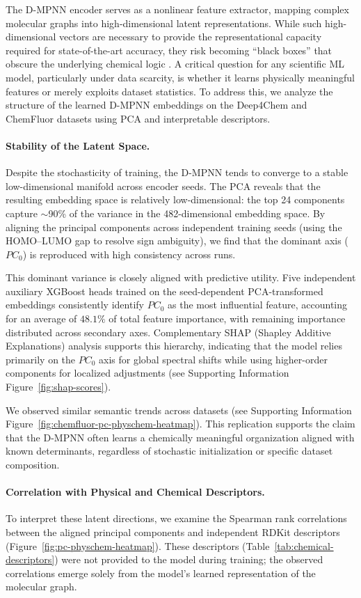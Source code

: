 The D-MPNN encoder serves as a nonlinear feature extractor, mapping complex molecular graphs into high-dimensional latent representations. While such high-dimensional vectors are necessary to provide the representational capacity required for state-of-the-art accuracy, they risk becoming ``black boxes'' that obscure the underlying chemical logic \cite{yang2019analyzing, gomez2018automatic}. A critical question for any scientific ML model, particularly under data scarcity, is whether it learns physically meaningful features or merely exploits dataset statistics. To address this, we analyze the structure of the learned D-MPNN embeddings on the Deep4Chem and ChemFluor datasets using PCA and interpretable descriptors.


\paragraph{Stability of the Latent Space.}
Despite the stochasticity of training, the D-MPNN tends to converge to a stable low-dimensional manifold across encoder seeds. The PCA reveals that the resulting embedding space is relatively low-dimensional: the top 24 components capture $\sim$90\% of the variance in the 482-dimensional embedding space. By aligning the principal components across independent training seeds (using the HOMO--LUMO gap to resolve sign ambiguity), we find that the dominant axis ($PC_0$) is reproduced with high consistency across runs.

This dominant variance is closely aligned with predictive utility. Five independent auxiliary XGBoost heads trained on the seed-dependent PCA-transformed embeddings consistently identify $PC_0$ as the most influential feature, accounting for an average of $48.1\%$ of total feature importance, with remaining importance distributed across secondary axes. Complementary SHAP (Shapley Additive Explanations) analysis supports this hierarchy, indicating that the model relies primarily on the $PC_0$ axis for global spectral shifts while using higher-order components for localized adjustments (see Supporting Information Figure~\ref{fig:shap-scores}).

We observed similar semantic trends across datasets (see Supporting Information Figure~\ref{fig:chemfluor-pc-physchem-heatmap}). This replication supports the claim that the D-MPNN often learns a chemically meaningful organization aligned with known determinants, regardless of stochastic initialization or specific dataset composition.

\paragraph{Correlation with Physical and Chemical Descriptors.}
To interpret these latent directions, we examine the Spearman rank correlations between the aligned principal components and independent RDKit descriptors (Figure~\ref{fig:pc-physchem-heatmap}). These descriptors (Table~\ref{tab:chemical-descriptors}) were not provided to the model during training; the observed correlations emerge solely from the model's learned representation of the molecular graph. 

